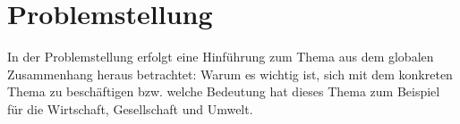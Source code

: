 \section{Problemstellung}\label{sec:problem}

In der Problemstellung erfolgt eine Hinführung zum Thema aus dem globalen Zusammenhang heraus betrachtet: Warum es wichtig ist, sich mit dem konkreten Thema zu beschäftigen bzw. welche Bedeutung hat dieses Thema zum Beispiel für die Wirtschaft, Gesellschaft und Umwelt.
